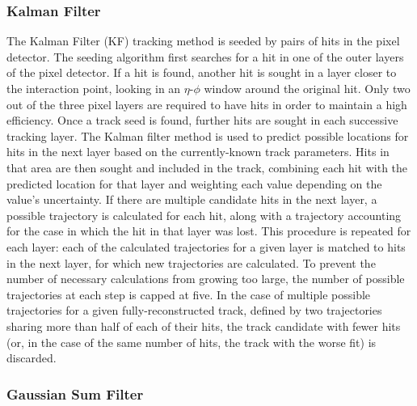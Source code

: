 \subsubsection{Kalman Filter}
\label{evReco:KF}
The Kalman Filter (KF) tracking method \cite{CMS-NOTE-2006-041} 
is seeded \cite{CMS-NOTE-2006-026}
by pairs of hits in the pixel detector.  
The seeding algorithm first searches for a hit 
in one of the outer layers of the pixel detector.  
If a hit is found, another hit is sought in a 
layer closer to the interaction point, 
looking in an $\eta$-$\phi$ window around 
the original hit.  
Only two out of the three pixel layers are 
required to have hits 
in order to maintain a high efficiency.  
Once a track seed is found, 
further hits are sought in each successive tracking layer. 
The Kalman filter method is used to predict possible 
locations for hits in the next layer based on 
the currently-known track parameters. %
Hits in that area are then sought and included 
in the track, combining each hit with the 
predicted location for that layer and weighting 
each value depending on the value's uncertainty.  
If there are multiple candidate hits in the next layer, 
a possible trajectory is calculated for each hit, 
along with a trajectory accounting for the case 
in which the hit in that layer was lost.  
This procedure is repeated for each layer: 
each of the calculated trajectories for a given layer 
is matched to hits in the next layer, 
for which new trajectories are calculated.  
To prevent the number of necessary calculations 
from growing too large, 
the number of possible trajectories at each step 
is capped at five.  
In the case of multiple possible trajectories 
for a given fully-reconstructed track, 
defined by two trajectories sharing more than 
half of each of their hits,
the track candidate with fewer hits 
(or, in the case of the same number of hits, 
the track with the worse fit)
is discarded.  

\subsubsection{Gaussian Sum Filter}
\label{evReco:GSF}

